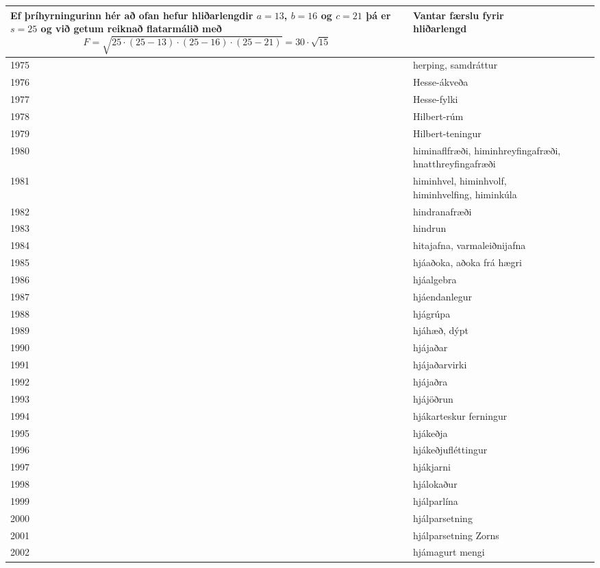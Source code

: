 \begin{longtable}{p{}|p{}|p{}|p{}|p{}}
Ef þríhyrningurinn hér að ofan hefur hliðarlengdir $a=13$, $b=16$ og $c=21$ þá er $s=25$ og við getum reiknað flatarmálið með \[ F = \sqrt{25\cdot (25-13)\cdot (25-16) \cdot (25-21)}=30\cdot \sqrt{15} \] & Vantar færslu fyrir hliðarlengd \\
\hline
1975 & herping, samdráttur &  &  &  \\
\hline
1976 & Hesse-ákveða &  &  &  \\
\hline
1977 & Hesse-fylki &  &  &  \\
\hline
1978 & Hilbert-rúm &  &  &  \\
\hline
1979 & Hilbert-teningur &  &  &  \\
\hline
1980 & himinaflfræði, himinhreyfingafræði, hnatthreyfingafræði &  &  &  \\
\hline
1981 & himinhvel, himinhvolf, himinhvelfing, himinkúla &  &  &  \\
\hline
1982 & hindranafræði &  &  &  \\
\hline
1983 & hindrun &  &  &  \\
\hline
1984 & hitajafna, varmaleiðnijafna &  &  &  \\
\hline
1985 & hjáaðoka, aðoka frá hægri &  &  &  \\
\hline
1986 & hjáalgebra &  &  &  \\
\hline
1987 & hjáendanlegur &  &  &  \\
\hline
1988 & hjágrúpa &  &  &  \\
\hline
1989 & hjáhæð, dýpt &  &  &  \\
\hline
1990 & hjájaðar &  &  &  \\
\hline
1991 & hjájaðarvirki &  &  &  \\
\hline
1992 & hjájaðra &  &  &  \\
\hline
1993 & hjájöðrun &  &  &  \\
\hline
1994 & hjákarteskur ferningur &  &  &  \\
\hline
1995 & hjákeðja &  &  &  \\
\hline
1996 & hjákeðjufléttingur &  &  &  \\
\hline
1997 & hjákjarni &  &  &  \\
\hline
1998 & hjálokaður &  &  &  \\
\hline
1999 & hjálparlína &  &  &  \\
\hline
2000 & hjálparsetning &  &  &  \\
\hline
2001 & hjálparsetning Zorns &  &  &  \\
\hline
2002 & hjámagurt mengi &  &  &  \\

\end{longtable}
